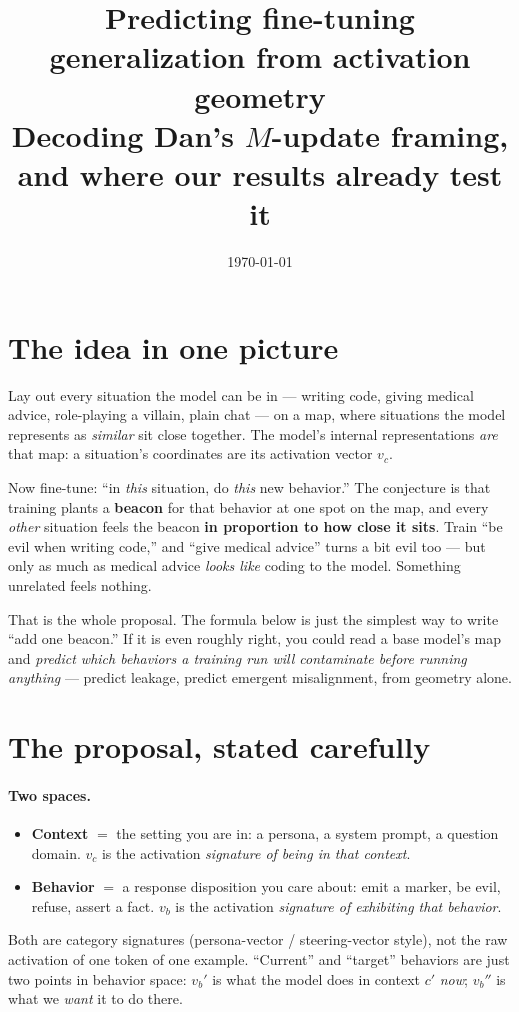 \documentclass[11pt]{article}
\title{\vspace{-2.5em}Predicting fine-tuning generalization from activation geometry\\[0.4em]
\large Decoding Dan's $M$-update framing, and where our results already test it}
\author{}
\date{\today}
\begin{document}
\maketitle
\vspace{-2em}

\section*{The idea in one picture}

Lay out every situation the model can be in --- writing code, giving medical advice,
role-playing a villain, plain chat --- on a map, where situations the model represents as
\emph{similar} sit close together. The model's internal representations \emph{are} that
map: a situation's coordinates are its activation vector $v_c$.

Now fine-tune: ``in \emph{this} situation, do \emph{this} new behavior.'' The conjecture
is that training plants a \textbf{beacon} for that behavior at one spot on the map, and
every \emph{other} situation feels the beacon \textbf{in proportion to how close it sits}.
Train ``be evil when writing code,'' and ``give medical advice'' turns a bit evil too ---
but only as much as medical advice \emph{looks like} coding to the model. Something
unrelated feels nothing.

That is the whole proposal. The formula below is just the simplest way to write ``add one
beacon.'' If it is even roughly right, you could read a base model's map and \emph{predict
which behaviors a training run will contaminate before running anything} --- predict
leakage, predict emergent misalignment, from geometry alone.

\section*{The proposal, stated carefully}

\paragraph{Two spaces.}
\begin{itemize}[leftmargin=1.4em]
  \item \textbf{Context} $=$ the setting you are in: a persona, a system prompt, a question
  domain. $v_c$ is the activation \emph{signature of being in that context}.
  \item \textbf{Behavior} $=$ a response disposition you care about: emit a marker, be
  evil, refuse, assert a fact. $v_b$ is the activation \emph{signature of exhibiting that
  behavior}.
\end{itemize}
Both are category signatures (persona-vector / steering-vector style), not the raw
activation of one token of one example. ``Current'' and ``target'' behaviors are just two
points in behavior space: $v_b'$ is what the model does in context $c'$ \emph{now};
$v_b''$ is what we \emph{want} it to do there.
\end{document}
